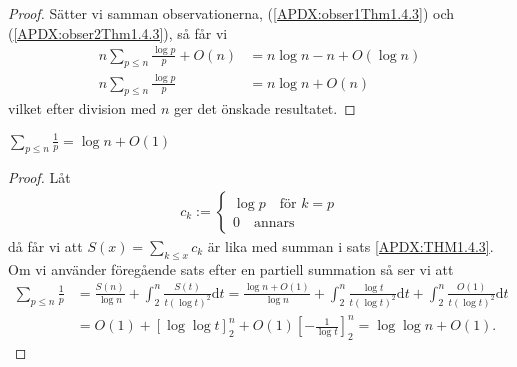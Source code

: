 \begin{proof}
Sätter vi samman observationerna, (\ref{APDX:obser1Thm1.4.3}) och (\ref{APDX:obser2Thm1.4.3}), så får vi 
\begin{align*}
    n \sum_{p \leq n} \frac{\log p}{p} + O(n) &= n \log n - n + O(\log n) \\
    n \sum_{p \leq n} \frac{\log p}{p} &= n \log n + O(n)
\end{align*}
vilket efter division med $n$ ger det önskade resultatet.
\end{proof}

\begin{theorem} \label{APDX:THM1.4.4}
    \(\sum_{p \leq n} \frac{1}{p} = \log n + O(1)\) 
\end{theorem}
\begin{proof}
Låt
\begin{align*}
    c_k := 
    \begin{cases}
    \log p \quad \text{för } k = p \\
    0 \quad \text{annars}
    \end{cases}
\end{align*}
då får vi att \(S(x) = \sum_{k \leq x} c_k\) är lika med summan i sats \ref{APDX:THM1.4.3}. Om vi använder föregående sats efter en partiell summation så ser vi att
\begin{align*}
    \sum_{p \leq n} \frac{1}{p} &= \frac{S(n)}{\log n} + \int_2^n \frac{S(t)}{t(\log t)^2} \text{d}t 
    = \frac{\log n + O(1)}{\log n} + \int_2^n \frac{\log t}{t(\log t)^2} \text{d}t + \int_2^n \frac{O(1)}{t(\log t)^2} \text{d}t \\
    &= O(1) + \left[\log \log t \right]_2^n + O(1) \left[- \frac{1}{\log t} \right]_2^n
    = \log \log n  + O(1).
\end{align*}

\end{proof}